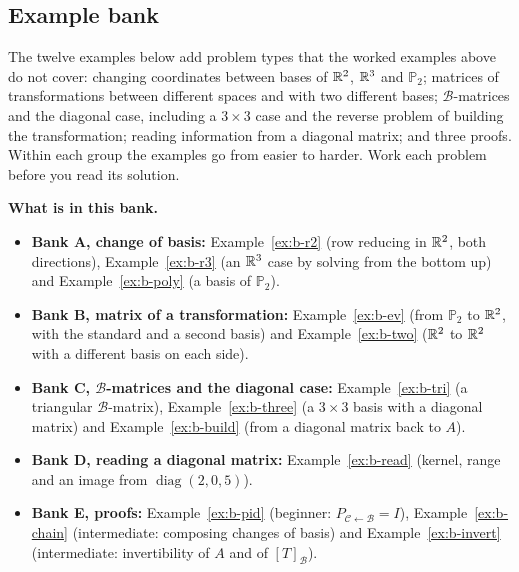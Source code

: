 \documentclass[11pt]{article}
\begin{document}
\subsection*{Example bank}
The twelve examples below add problem types that the worked examples above do not cover: changing coordinates between bases of $\mathbb{R}^2$, $\mathbb{R}^3$ and $\mathbb{P}_2$; matrices of transformations between different spaces and with two different bases; $\mathcal{B}$-matrices and the diagonal case, including a $3\times3$ case and the reverse problem of building the transformation; reading information from a diagonal matrix; and three proofs. Within each group the examples go from easier to harder. Work each problem before you read its solution.

\textbf{What is in this bank.}
\begin{itemize}
  \item \textbf{Bank A, change of basis:} Example~\ref{ex:b-r2} (row reducing in $\mathbb{R}^2$, both directions), Example~\ref{ex:b-r3} (an $\mathbb{R}^3$ case by solving from the bottom up) and Example~\ref{ex:b-poly} (a basis of $\mathbb{P}_2$).
  \item \textbf{Bank B, matrix of a transformation:} Example~\ref{ex:b-ev} (from $\mathbb{P}_2$ to $\mathbb{R}^2$, with the standard and a second basis) and Example~\ref{ex:b-two} ($\mathbb{R}^2$ to $\mathbb{R}^2$ with a different basis on each side).
  \item \textbf{Bank C, $\mathcal{B}$-matrices and the diagonal case:} Example~\ref{ex:b-tri} (a triangular $\mathcal{B}$-matrix), Example~\ref{ex:b-three} (a $3\times3$ basis with a diagonal matrix) and Example~\ref{ex:b-build} (from a diagonal matrix back to $A$).
  \item \textbf{Bank D, reading a diagonal matrix:} Example~\ref{ex:b-read} (kernel, range and an image from $\operatorname{diag}(2,0,5)$).
  \item \textbf{Bank E, proofs:} Example~\ref{ex:b-pid} (beginner: $P_{\mathcal{C}\leftarrow\mathcal{B}}=I$), Example~\ref{ex:b-chain} (intermediate: composing changes of basis) and Example~\ref{ex:b-invert} (intermediate: invertibility of $A$ and of $[T]_{\mathcal{B}}$).
\end{itemize}
\end{document}
